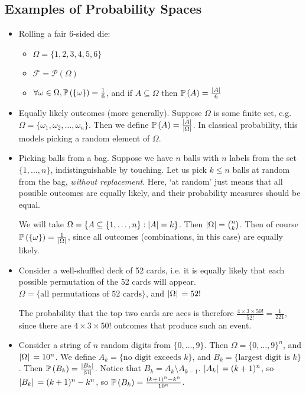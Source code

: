 \documentclass{article}
\begin{document}
\subsection{Examples of Probability Spaces}
\begin{itemize}
	\item Rolling a fair 6-sided die:
	      \begin{itemize}
		      \item $\Omega = \{ 1, 2, 3, 4, 5, 6 \}$
		      \item $\mathcal F = \mathcal P(\Omega)$
		      \item $\forall \omega \in \Omega, \mathbb{P}\left({\{ \omega \}}\right) = \frac{1}{6}$, and if $A \subseteq \Omega$ then $\mathbb{P}\left({A}\right) = \frac{\abs{A}}{6}$
	      \end{itemize}

	\item Equally likely outcomes (more generally). Suppose $\Omega$ is some finite set, e.g. $\Omega = \{ \omega_1, \omega_2, \dots, \omega_n \}$. Then we define $\mathbb{P}\left({A}\right) = \frac{\abs{A}}{\abs{\Omega}}$. In classical probability, this models picking a random element of $\Omega$.

	\item Picking balls from a bag. Suppose we have $n$ balls with $n$ labels from the set $\{1, \dots, n\}$, indistinguishable by touching. Let us pick $k \leq n$ balls at random from the bag, \textit{without replacement}. Here, `at random' just means that all possible outcomes are equally likely, and their probability measures should be equal.

	      We will take $\Omega = \{ A \subseteq \{1, \dots, n\} : \abs{A} = k \}$. Then $\abs{\Omega} = \binom{n}{k}$. Then of course $\mathbb{P}\left({\{ \omega \}}\right) = \frac{1}{\abs*{\Omega}}$, since all outcomes (combinations, in this case) are equally likely.

	\item Consider a well-shuffled deck of 52 cards, i.e. it is equally likely that each possible permutation of the 52 cards will appear. $\Omega = \{ \text{all permutations of 52 cards} \}$, and $\abs*{\Omega} = 52!$

	      The probability that the top two cards are aces is therefore $\frac{4 \times 3 \times 50!}{52!} = \frac{1}{221}$, since there are $4 \times 3 \times 50!$ outcomes that produce such an event.

	\item Consider a string of $n$ random digits from $\{0, \dots, 9\}$. Then $\Omega = \{ 0, \dots, 9 \}^n$, and $\abs*{\Omega} = 10^n$. We define $A_k = \{ \text{no digit exceeds } k \}$, and $B_k = \{ \text{largest digit is } k \}$. Then $\mathbb{P}\left({B_k}\right) = \frac{\abs*{B_k}}{\abs*{\Omega}}$. Notice that $B_k = A_k \setminus A_{k-1}$. $\abs*{A_k} = (k+1)^n$, so $\abs*{B_k} = (k+1)^n - k^n$, so $\mathbb{P}\left({B_k}\right) = \frac{(k+1)^n - k^n}{10^n}$.


\end{itemize}
\end{document}
